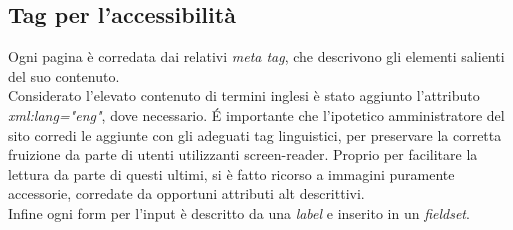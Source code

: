\documentclass{tecweb}
\begin{document}
	\subsection{Tag per l'accessibilità}
	Ogni pagina è corredata dai relativi \textit{meta tag}, che descrivono gli elementi salienti del suo contenuto. \\
	Considerato l'elevato contenuto di termini inglesi è stato aggiunto l'attributo \textit{xml:lang="eng"}, dove necessario. \'E importante che l'ipotetico amministratore del sito corredi le aggiunte con gli adeguati tag linguistici, per preservare la corretta fruizione da parte di utenti utilizzanti screen-reader. Proprio per facilitare la lettura da parte di questi ultimi, si è fatto ricorso a immagini puramente accessorie, corredate da opportuni attributi alt descrittivi. \\
	Infine ogni form per l'input è descritto da una \textit{label} e inserito in un \textit{fieldset}.
\end{document}
